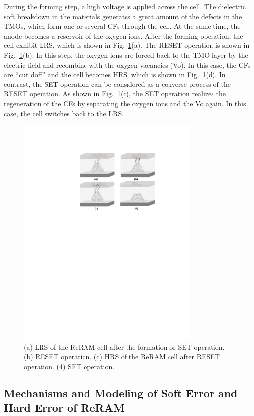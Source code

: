 During the forming step, a high voltage is applied across the cell. The dielectric soft breakdown in the materials generates a great amount of the defects in the TMOs, which form one or several CFs through the cell. At the same time, the anode becomes a reservoir of the oxygen ions. After the forming operation, the cell exhibit LRS, which is shown in Fig.~\ref{fig:filament}(a). The RESET operation is shown in Fig.~\ref{fig:filament}(b). In this step, the oxygen ions are forced back to the TMO layer by the electric field and recombine with the oxygen vacancies (Vo). In this case, the CFs are ``cut doff'' and the cell becomes HRS, which is shown in Fig.~\ref{fig:filament}(d). In contrast, the SET operation can be considered as a converse process of the RESET operation. As shown in Fig.~\ref{fig:filament}(c), the SET operation realizes the regeneration of the CFs by separating the oxygen ions and the Vo again. In this case, the cell switches back to the LRS.
\begin{figure}[!t]
\centering
    \includegraphics[width=3.5in]{./fig/DATE2.pdf}
\caption{(a) LRS of the ReRAM cell after the formation or SET operation.  (b) RESET operation. (c) HRS of the ReRAM cell after RESET operation. (4) SET operation.}
\label{fig:filament}
\end{figure}

\subsection{Mechanisms and Modeling of Soft Error and Hard Error of ReRAM} \label{sec:Model}

